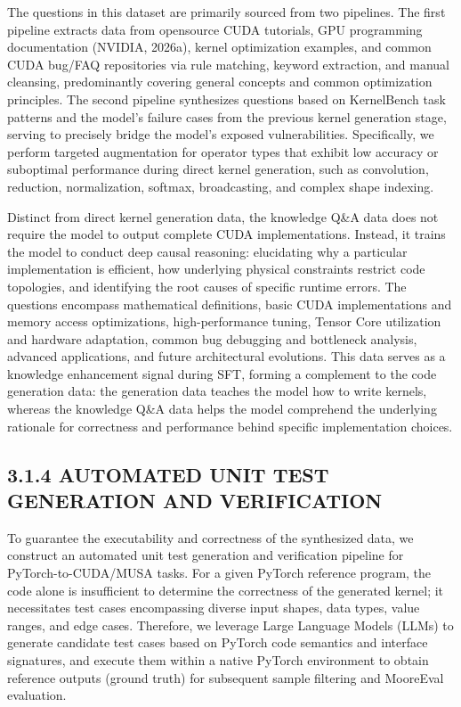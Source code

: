 \documentclass[
  10
]{article}
\begin{document}
The questions in this dataset are primarily sourced from two pipelines.
The first pipeline extracts data from opensource CUDA tutorials, GPU
programming documentation (NVIDIA, 2026a), kernel optimization examples,
and common CUDA bug/FAQ repositories via rule matching, keyword
extraction, and manual cleansing, predominantly covering general
concepts and common optimization principles. The second pipeline
synthesizes questions based on KernelBench task patterns and the model's
failure cases from the previous kernel generation stage, serving to
precisely bridge the model's exposed vulnerabilities. Specifically, we
perform targeted augmentation for operator types that exhibit low
accuracy or suboptimal performance during direct kernel generation, such
as convolution, reduction, normalization, softmax, broadcasting, and
complex shape indexing.

Distinct from direct kernel generation data, the knowledge Q\&A data
does not require the model to output complete CUDA implementations.
Instead, it trains the model to conduct deep causal reasoning:
elucidating why a particular implementation is efficient, how underlying
physical constraints restrict code topologies, and identifying the root
causes of specific runtime errors. The questions encompass mathematical
definitions, basic CUDA implementations and memory access optimizations,
high-performance tuning, Tensor Core utilization and hardware
adaptation, common bug debugging and bottleneck analysis, advanced
applications, and future architectural evolutions. This data serves as a
knowledge enhancement signal during SFT, forming a complement to the
code generation data: the generation data teaches the model how to write
kernels, whereas the knowledge Q\&A data helps the model comprehend the
underlying rationale for correctness and performance behind specific
implementation choices.

\subsection{3.1.4 AUTOMATED UNIT TEST GENERATION AND
VERIFICATION}\label{automated-unit-test-generation-and-verification}

To guarantee the executability and correctness of the synthesized data,
we construct an automated unit test generation and verification pipeline
for PyTorch-to-CUDA/MUSA tasks. For a given PyTorch reference program,
the code alone is insufficient to determine the correctness of the
generated kernel; it necessitates test cases encompassing diverse input
shapes, data types, value ranges, and edge cases. Therefore, we leverage
Large Language Models (LLMs) to generate candidate test cases based on
PyTorch code semantics and interface signatures, and execute them within
a native PyTorch environment to obtain reference outputs (ground truth)
for subsequent sample filtering and MooreEval evaluation.
\end{document}
